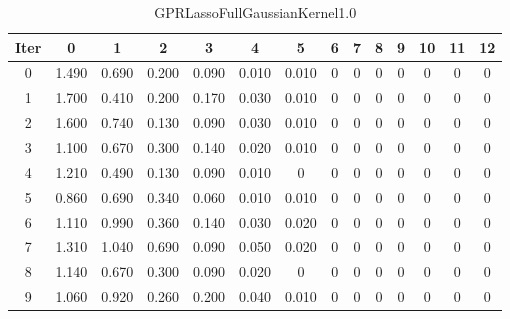 \begin{table}
	\begin{center}
		\begin{tabular}{|c|c|c|c|c|c|c|c|c|c|c|c|c|c|}
			\hline
			Iter & 0 & 1 & 2 & 3 & 4 & 5 & 6 & 7 & 8 & 9 & 10 & 11 & 12 \\
			\hline
			0 & 1.490 & 0.690 & 0.200 & 0.090 & 0.010 & 0.010 & 0 & 0 & 0 & 0 & 0 & 0 & 0 \\
			\hline
			1 & 1.700 & 0.410 & 0.200 & 0.170 & 0.030 & 0.010 & 0 & 0 & 0 & 0 & 0 & 0 & 0 \\
			\hline
			2 & 1.600 & 0.740 & 0.130 & 0.090 & 0.030 & 0.010 & 0 & 0 & 0 & 0 & 0 & 0 & 0 \\
			\hline
			3 & 1.100 & 0.670 & 0.300 & 0.140 & 0.020 & 0.010 & 0 & 0 & 0 & 0 & 0 & 0 & 0 \\
			\hline
			4 & 1.210 & 0.490 & 0.130 & 0.090 & 0.010 & 0 & 0 & 0 & 0 & 0 & 0 & 0 & 0 \\
			\hline
			5 & 0.860 & 0.690 & 0.340 & 0.060 & 0.010 & 0.010 & 0 & 0 & 0 & 0 & 0 & 0 & 0 \\
			\hline
			6 & 1.110 & 0.990 & 0.360 & 0.140 & 0.030 & 0.020 & 0 & 0 & 0 & 0 & 0 & 0 & 0 \\
			\hline
			7 & 1.310 & 1.040 & 0.690 & 0.090 & 0.050 & 0.020 & 0 & 0 & 0 & 0 & 0 & 0 & 0 \\
			\hline
			8 & 1.140 & 0.670 & 0.300 & 0.090 & 0.020 & 0 & 0 & 0 & 0 & 0 & 0 & 0 & 0 \\
			\hline
			9 & 1.060 & 0.920 & 0.260 & 0.200 & 0.040 & 0.010 & 0 & 0 & 0 & 0 & 0 & 0 & 0 \\
			\hline
		\end{tabular}
	\end{center}
	\caption{GPRLassoFullGaussianKernel1.0}
\end{table}